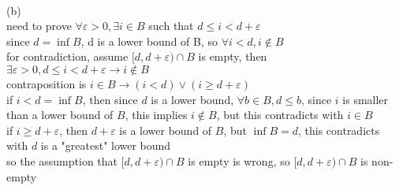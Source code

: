 \documentclass[12pt, border = 4pt, multi]{article} %
\begin{document}
\\
(b)\\
need to prove $\forall \varepsilon > 0, \exists i \in B$ such that $d \leq i < d + \varepsilon$\\
since $d = \inf B$, d is a lower bound of B, so $\forall i < d, i \not\in B$\\
for contradiction, assume $[d, d + \varepsilon) \cap B$ is empty, then $\exists \varepsilon > 0, d \leq i < d + \varepsilon \longrightarrow i \not\in B$\\
contraposition is $i \in B \longrightarrow (i < d) \vee (i \geq d + \varepsilon)$\\
if $i < d = \inf B$, then since $d$ is a lower bound, $\forall b \in B, d \leq b$, since $i$ is smaller than a lower bound of $B$, this implies $i \not\in B$, but this contradicts with $i \in B$\\
if $i \geq d + \varepsilon$, then $d + \varepsilon$ is a lower bound of $B$, but $\inf B = d$, this contradicts with $d$ is a "greatest" lower bound\\
so the assumption that $[d, d + \varepsilon) \cap B$ is empty is wrong, so $[d, d + \varepsilon) \cap B$ is non-empty
\end{document}
